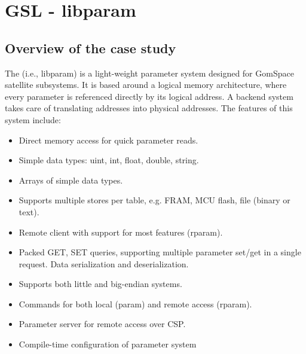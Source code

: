 
 

\clearpage
\section{GSL - libparam}
\label{sec:caseStudies:GSL:libparam}

\subsection{Overview of the case study}

The  (i.e., libparam) is a light-weight parameter system designed for GomSpace satellite subsystems. It is based around a logical memory architecture, where every parameter is referenced directly by its logical address. A backend system takes care of translating addresses into physical addresses.
The features of this system include:
\begin{itemize}
\item Direct memory access for quick parameter reads.
\item Simple data types: uint, int, float, double, string.
\item Arrays of simple data types.
\item Supports multiple stores per table, e.g. FRAM, MCU flash, file (binary or text).
\item Remote client with support for most features (rparam).
\item Packed GET, SET queries, supporting multiple parameter set/get in a single request. Data serialization and deserialization.
\item Supports both little and big-endian systems.
\item Commands for both local (param) and remote access (rparam).
\item Parameter server for remote access over CSP.
\item Compile-time configuration of parameter system
\end{itemize}

